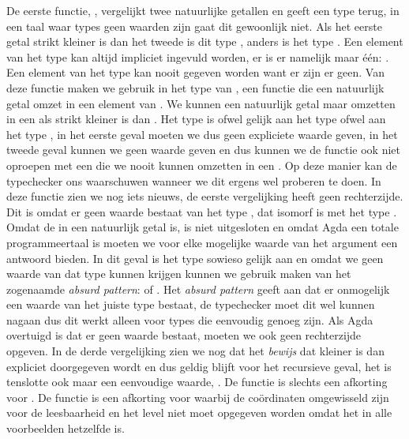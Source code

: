 De eerste functie, , vergelijkt twee natuurlijke getallen en geeft
een type terug, in een taal waar types geen waarden zijn gaat dit gewoonlijk
niet. Als het eerste getal strikt kleiner is dan het tweede is dit type
, anders is het type . Een element van het type  kan
altijd impliciet ingevuld worden, er is er namelijk maar één: . Een
element van het type  kan nooit gegeven worden want er zijn er geen.
Van deze functie maken we gebruik in het type van , een functie
die een natuurlijk getal omzet in een element van . We kunnen een
natuurlijk getal  maar omzetten in een  als 
strikt kleiner is dan . Het type  is ofwel gelijk aan
het type  ofwel aan het type , in het eerste geval moeten we
dus geen expliciete waarde geven, in het tweede geval kunnen we geen waarde
geven en dus kunnen we de functie ook niet oproepen met een  die we
nooit kunnen omzetten in een . Op deze manier kan de typechecker
ons waarschuwen wanneer we dit ergens wel proberen te doen. In deze functie
zien we nog iets nieuws, de eerste vergelijking heeft geen rechterzijde. Dit is
omdat er geen waarde bestaat van het type , dat isomorf is met het
type . Omdat de  in  een natuurlijk getal is, is
 niet uitgesloten en omdat Agda een totale programmeertaal is moeten
we voor elke mogelijke waarde van het argument  een antwoord bieden.
In dit geval is het type  sowieso gelijk aan  en omdat
we geen waarde van dat type kunnen krijgen kunnen we gebruik maken van het
zogenaamde \emph{absurd pattern}: \iagda{{}} of \iagda{()}. Het \emph{absurd
pattern} geeft aan dat er onmogelijk een waarde van het juiste type bestaat, de
typechecker moet dit wel kunnen nagaan dus dit werkt alleen voor types die
eenvoudig genoeg zijn. Als Agda overtuigd is dat er geen waarde bestaat, moeten
we ook geen rechterzijde opgeven. In de derde vergelijking zien we nog dat het
\emph{bewijs} dat  kleiner is dan  expliciet doorgegeven
wordt en dus geldig blijft voor het recursieve geval, het is tenslotte ook maar
een eenvoudige waarde, . De functie  is slechts een
afkorting voor . De functie  is een afkorting voor
 waarbij de coördinaten omgewisseld zijn voor de leesbaarheid en
het level niet moet opgegeven worden omdat het in alle voorbeelden hetzelfde
is.

